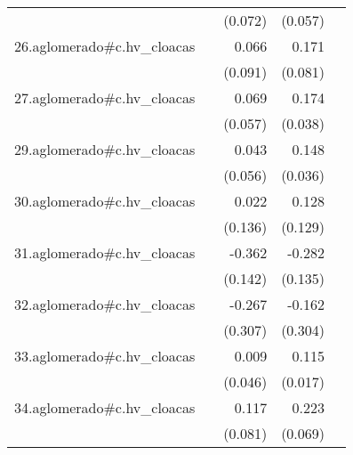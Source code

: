 {\begin{longtable}{l*{4}{D{.}{.}{-1}}}
            &                     &     (0.072)         &     (0.057)         &                     \\
\addlinespace
26.aglomerado#c.hv\_cloacas&                     &       0.066         &       0.171\sym{*}  &                     \\
            &                     &     (0.091)         &     (0.081)         &                     \\
\addlinespace
27.aglomerado#c.hv\_cloacas&                     &       0.069         &       0.174\sym{***}&                     \\
            &                     &     (0.057)         &     (0.038)         &                     \\
\addlinespace
29.aglomerado#c.hv\_cloacas&                     &       0.043         &       0.148\sym{***}&                     \\
            &                     &     (0.056)         &     (0.036)         &                     \\
\addlinespace
30.aglomerado#c.hv\_cloacas&                     &       0.022         &       0.128         &                     \\
            &                     &     (0.136)         &     (0.129)         &                     \\
\addlinespace
31.aglomerado#c.hv\_cloacas&                     &      -0.362\sym{*}  &      -0.282\sym{*}  &                     \\
            &                     &     (0.142)         &     (0.135)         &                     \\
\addlinespace
32.aglomerado#c.hv\_cloacas&                     &      -0.267         &      -0.162         &                     \\
            &                     &     (0.307)         &     (0.304)         &                     \\
\addlinespace
33.aglomerado#c.hv\_cloacas&                     &       0.009         &       0.115\sym{***}&                     \\
            &                     &     (0.046)         &     (0.017)         &                     \\
\addlinespace
34.aglomerado#c.hv\_cloacas&                     &       0.117         &       0.223\sym{**} &                     \\
            &                     &     (0.081)         &     (0.069)         &                     \\

\end{longtable}}
